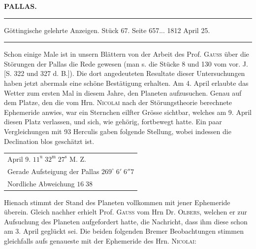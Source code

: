 \clearpage{}\hypertarget{native-354-lower}{}\label{native-354-lower}
\begin{center}\textbf{PALLAS.}\par\vspace{4pt}\hrule\vspace{4pt}\fontsize{10}{12}\selectfont Göttingische gelehrte Anzeigen. Stück 67. Seite 657\;... 1812 April 25.\par\vspace{4pt}\hrule\vspace{4pt}\end{center}

\par\indent Schon einige Male ist in unsern Blättern von der Arbeit des Prof. \textsc{Gauss} über die Störungen der Pallas die Rede gewesen (man s. die Stücke 8 und 130 vom vor. J. [S. 322 und 327 d. B.]). Die dort angedeuteten Resultate dieser Untersuchungen haben jetzt abermals eine schöne Bestätigung erhalten. Am 4. April erlaubte das Wetter zum ersten Mal in diesem Jahre, den Planeten aufzusuchen. Genau auf dem Platze, den die vom Hrn. \textsc{Nicolai} nach der Störungstheorie berechnete Ephemeride anwies, war ein Sternchen eilfter Grösse sichtbar, welches am 9. April diesen Platz verlassen, und sich, wie gehörig, fortbewegt hatte. Ein paar Vergleichungen mit 93 Herculis gaben folgende Stellung, wobei indessen die Declination blos geschätzt ist.

\begin{center}\fontsize{10}{12}\selectfont\setlength{\tabcolsep}{0pt}\renewcommand{\arraystretch}{1.15}\begin{tabular}{l}
April 9. $11^{\mathrm u}\;32^{\mathrm m}\;27^{\mathrm s}$ M. Z.\\
Gerade Aufsteigung der Pallas $269^\circ\;6'\;6''7$\\
Nordliche Abweichung $16\;38$
\end{tabular}\end{center}
\par\indent Hienach stimmt der Stand des Planeten vollkommen mit jener Ephemeride überein. Gleich nachher erhielt Prof. \textsc{Gauss} vom Hrn Dr. \textsc{Olbers}, welchen er zur Aufsuchung des Planeten aufgefordert hatte, die Nachricht, dass ihm diese schon am 3. April geglückt sei. Die beiden folgenden Bremer Beobachtungen stimmen gleichfalls aufs genaueste mit der Ephemeride des Hrn. \textsc{Nicolai}:

